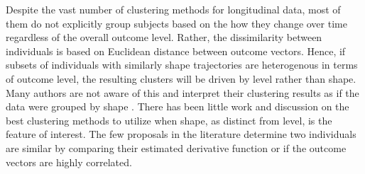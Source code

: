 \documentclass[12pt]{article}
\begin{document}
Despite the vast number of clustering methods for longitudinal data, most of them do not explicitly group subjects based on the how they change over time regardless of the overall outcome level. Rather, the dissimilarity between individuals is based on Euclidean distance between outcome vectors. Hence, if subsets of individuals with similarly shape trajectories are heterogenous in terms of outcome level, the resulting clusters will be driven by level rather than shape. Many authors are not aware of this and interpret their clustering results as if the data were grouped by shape \cite{pryor2011,carter2012,nagin1999}. There has been little work and discussion on the best clustering methods to utilize when shape, as distinct from level, is the feature of interest. The few proposals in the literature determine two individuals are similar by comparing their estimated derivative function or if the outcome vectors are highly correlated. 
\end{document}
